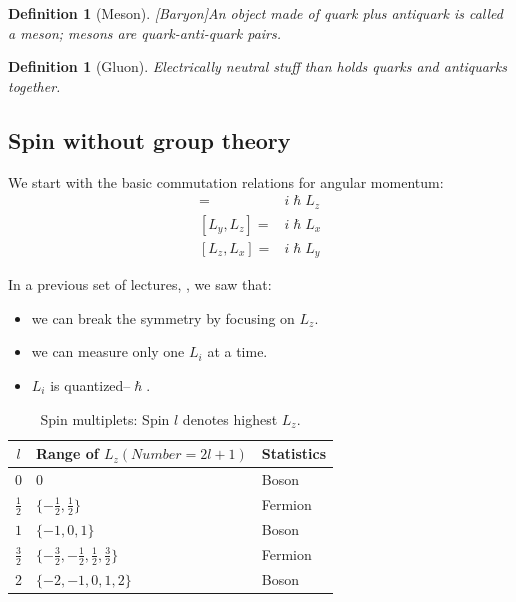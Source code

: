 \documentclass[]{article}
\newtheorem{defn}[thm]{Definition}
\begin{document}
\begin{defn}[Meson][Baryon]\label{defn:meson}
	An object made of quark plus antiquark is called a meson; mesons are quark-anti-quark pairs.
\end{defn}

\begin{defn}[Gluon]
	Electrically neutral stuff than holds quarks and antiquarks together.
\end{defn}

\subsection{Spin without group theory}
We start with the basic commutation relations for angular momentum:\cite{susskind2009particles}
\begin{align*}
	[L_x,L_y] =& i \hslash L_z\\
	[L_y,L_z] =& i \hslash L_x\\
	[L_z,L_x] =& i \hslash L_y
\end{align*}

In a previous set of lectures, \cite{susskind2009particles}, we saw that:

\begin{itemize}
	\item we can break the symmetry by focusing on $L_z$.
	\item we can measure only one $L_i$ at a time.
	\item $L_i$ is quantized--$\hslash$.
\end{itemize}

\begin{table}[H]
	\begin{center}
		\caption{Spin multiplets: Spin $l$ denotes highest $L_z$.}
		\begin{tabular}{|c|l|l|} \hline
		$l$&Range of $L_z (Number=2l+1)$&Statistics\\ \hline
		$0$&$0$& Boson\\ \hline
		$\frac{1}{2}$&$\{-\frac{1}{2},\frac{1}{2}\}$& Fermion\\ \hline
		$1$&$\{-1,0,1\}$&Boson \\ \hline
		$\frac{3}{2}$&$\{-\frac{3}{2},-\frac{1}{2},\frac{1}{2},\frac{3}{2}\}$&Fermion \\ \hline
		$2$&$\{-2,-1,0,1,2\}$&Boson \\ \hline
		\end{tabular}
	\end{center}
\end{table}
\end{document}
